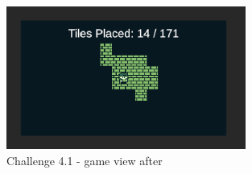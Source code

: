 \documentclass[a4paper, 12pt, one column, aas_macros]{article}
\begin{document}
\begin{figure}[htbp]
  \centering
  \includegraphics[width=0.7\textwidth]{images/difficulty-1-after.png}
  \caption{Challenge 4.1 - game view after}
  \label{fig:difficulty-1-after}
\end{figure}


\end{document}
